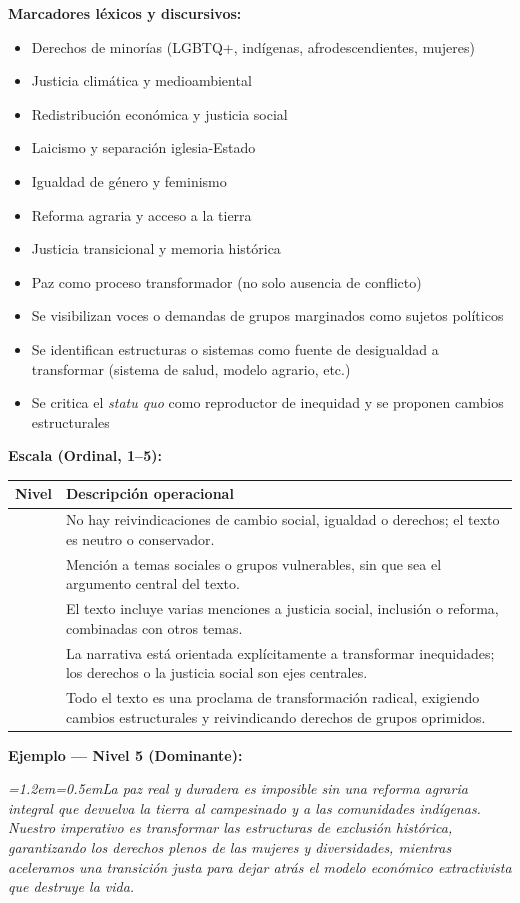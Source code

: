 \documentclass[11pt,letterpaper]{article}
\newcommand{\ejemplo}[2]{%
  \par\smallskip\noindent\textbf{Ejemplo — #1:}\par\nopagebreak
  \begingroup\itshape\small\leftskip=1.2em\rightskip=0.5em\noindent #2\par\endgroup\smallskip}
\begin{document}
\textbf{Marcadores léxicos y discursivos:}
\begin{itemize}
\item Derechos de minorías (LGBTQ+, indígenas, afrodescendientes, mujeres)
\item Justicia climática y medioambiental
\item Redistribución económica y justicia social
\item Laicismo y separación iglesia-Estado
\item Igualdad de género y feminismo
\item Reforma agraria y acceso a la tierra
\item Justicia transicional y memoria histórica
\item Paz como proceso transformador (no solo ausencia de conflicto)
\item Se visibilizan voces o demandas de grupos marginados como sujetos políticos
\item Se identifican estructuras o sistemas como fuente de desigualdad a transformar (sistema de salud,
modelo agrario, etc.)
\item Se critica el \emph{statu quo} como reproductor de inequidad y se proponen cambios estructurales
\end{itemize}

\textbf{Escala (Ordinal, 1–5):}
\begin{longtable}{@{}>{\centering\arraybackslash}p{1.1cm}p{14.3cm}@{}}
\toprule \textbf{Nivel} & \textbf{Descripción operacional}\\ \midrule\endhead
1 & No hay reivindicaciones de cambio social, igualdad o derechos; el texto es neutro o conservador.\\
\addlinespace
2 & Mención a temas sociales o grupos vulnerables, sin que sea el argumento central del texto.\\
\addlinespace
3 & El texto incluye varias menciones a justicia social, inclusión o reforma, combinadas con otros temas.\\
\addlinespace
4 & La narrativa está orientada explícitamente a transformar inequidades; los derechos o la justicia social
son ejes centrales.\\
\addlinespace
5 & Todo el texto es una proclama de transformación radical, exigiendo cambios estructurales y
reivindicando derechos de grupos oprimidos.\\
\bottomrule
\end{longtable}

\ejemplo{Nivel 5 (Dominante)}{La paz real y duradera es imposible sin una reforma agraria integral que
devuelva la tierra al campesinado y a las comunidades indígenas. Nuestro imperativo es transformar las
estructuras de exclusión histórica, garantizando los derechos plenos de las mujeres y diversidades, mientras
aceleramos una transición justa para dejar atrás el modelo económico extractivista que destruye la vida.}
\end{document}
